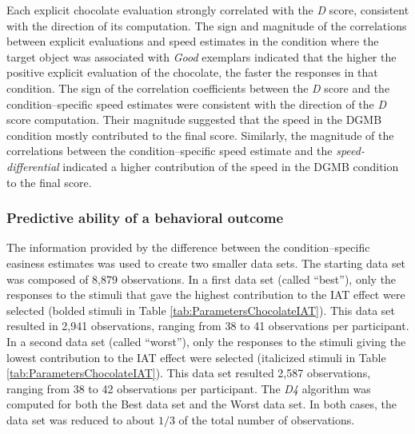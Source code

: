 \documentclass[12pt]{book}
\begin{document}
 Each explicit chocolate evaluation strongly correlated with the \emph{D} score, consistent with the direction of its computation. 
 The sign and magnitude of the correlations between explicit evaluations and speed estimates in the condition where the target object was associated with \emph{Good} exemplars indicated that the higher the positive explicit evaluation of the chocolate, the faster the responses in that condition. 
 The sign of the correlation coefficients between the \emph{D} score and the condition--specific speed estimates were consistent with the direction of the \emph{D} score computation. 
 Their magnitude suggested that the speed in the DGMB condition mostly contributed to the final score. Similarly, the magnitude of the correlations between the condition--specific speed estimate and the \emph{speed-differential} indicated a higher contribution of the speed in the DGMB condition to the final score. 

\subsubsection{Predictive ability of a behavioral outcome}\label{subsub:choice1}


The information provided by the difference between the condition--specific easiness estimates was used to create two smaller data sets. 
The starting data set was composed of 8,879 observations.
In a first data set (called ``best''), only the responses to the stimuli that gave the highest contribution to the IAT effect were selected (bolded stimuli in Table \ref{tab:ParametersChocolateIAT}). This data set resulted in 2,941 observations, ranging from 38
to 41 observations per participant. 
In a second data set (called ``worst''), only the responses to the stimuli giving the lowest contribution to the IAT effect were selected  (italicized stimuli in Table \ref{tab:ParametersChocolateIAT}). This data set resulted 2,587 observations, ranging from 38
to 42 observations per participant. The \emph{D4} algorithm was computed for both the Best
data set and the Worst data set. 
In both cases, the data set was reduced to about $1/3$ of the total number of observations.
\end{document}
